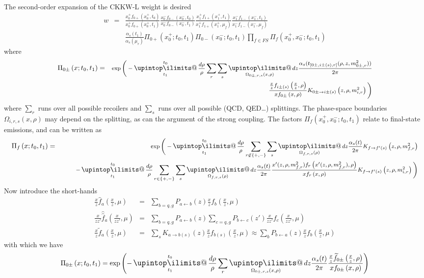 \documentclass[a4paper,11pt]{article}
\makeatletter
\newcommand{\mksmall}[1]{\textnormal{\smaller$#1$}}
\newcommand{\xfhathat}[3]{#2 \widehat{\widehat{f}}_{#1}\left(#2, #3\right)}
\newcommand{\xfhat}[3]{#2 \widehat{f}_{#1}\left(#2, #3\right)}
\newcommand{\xftilde}[3]{#2 \widetilde{f}_{#1}\left(#2, #3\right)}
\newcommand{\xf}[3]{#2 f_{#1}\left(#2, #3\right)}
\newcommand{\noem}[4]{\Pi_{#1}\left(#2; #3, #4\right)}
\newcommand{\psas}[2]{\frac{\alpha_s( t_{[#1]}(#2) )}{2\pi}}
\newcommand{\pskernel}[3]{K_{#1\rightarrow #2}\left(#3\right)}
\newcommand{\dglapkernel}[3]{P_{#1\leftarrow #2}\left(#3\right)}
\newcommand{\upint}{\DOTSI\upintop\ilimits@}
\renewcommand{\int}{\mathop{\mathlarger{\upint}}}
\makeatother
\begin{document}
The second-order expansion of the CKKW-L weight is desired
\begin{eqnarray}
w &=& 
\frac{ \xf{0+}{x_0^+}{t_0} }{ \xf{0+}{x_0^+}{t_1} }
\frac{\xf{0-}{x_0^-}{t_0}}{\xf{0-}{x_0^-}{t_1}}
\frac{\xf{1+}{x_1^+}{t_1}}{\xf{1+}{x_1^+}{\mu_f}}
\frac{\xf{1-}{x_1^-}{t_1}}{\xf{1-}{x_1^-}{\mu_f}}\\
&&
%
\frac{\alpha_s(t_1)}{\alpha_s(\mu_r)}
\noem{0+}{x_0^+}{t_0}{t_1}
\noem{0-}{x_0^-}{t_0}{t_1}
\prod_{f\in FS} \noem{f}{x_0^+,x_0^-}{t_0}{t_1}
\end{eqnarray}
where
\begin{eqnarray}
\noem{0\pm}{x}{t_0}{t_1} &=& \mksmall{\exp\Bigg(- \int\displaylimits_{t_1}^{t_0} \frac{d\rho}{\rho} \sum\limits_{r} \sum\limits_{s} \int\displaylimits_{\Omega_{0\pm,r,s}(x,\rho)} dz \psas{0\pm,i\pm(s),r}{\rho,z,m_{0\pm,r}^2}}
\\\nonumber
&&\qquad\qquad\qquad\qquad\qquad \mksmall{\frac{\xf{i\pm(s)}{\frac{x}{z}}{\rho}}{\xf{0\pm}{x}{\rho}} 
\pskernel{0\pm}{i\pm(s)}{z,\rho,m_{i,r}^2}
\Bigg)}
\end{eqnarray}
where $\sum_{r}$ runs over all possible recoilers and $\sum_{s}$ runs over all possible (QCD, QED\dots) splittings. The phase-space boundaries $\Omega_{i,r,s}(x,\rho)$ may depend on the splitting, as can the argument of the strong coupling. The factors $\noem{f}{x_0^+,x_0^-}{t_0}{t_1}$ relate to final-state emissions, and can be written as
\begin{eqnarray}
\noem{f}{x}{t_0}{t_1} &=& \mksmall{\exp\Bigg(- \int\displaylimits_{t_1}^{t_0} \frac{d\rho}{\rho} \sum\limits_{r\not\in \{+,-\}} \sum\limits_{s} \int\displaylimits_{\Omega_{f,r,s}(\rho)} dz \frac{\alpha_s(t)}{2\pi}
\pskernel{f}{f'(s)}{z,\rho,m_{f,r}^2}}\\\nonumber
&&\qquad 
\mksmall{- \int\displaylimits_{t_1}^{t_0} \frac{d\rho}{\rho} \sum\limits_{r\in \{+,-\}} \sum\limits_{s} \int\displaylimits_{\Omega_{f,r,s}(\rho)} dz \frac{\alpha_s(t)}{2\pi}
\frac{\xf{r}{x'(z,\rho,m_{f,r}^2)}{\rho}}{\xf{r}{x}{\rho}} 
\pskernel{f}{f'(s)}{z,\rho,m_{i,r}^2}
\Bigg)}
\end{eqnarray}
Now introduce the short-hands
\begin{eqnarray}
\xfhat{a}{\frac{x}{z}}{\mu} &=& \sum\limits_{b=q,g} \dglapkernel{a}{b}{z}  \xf{b}{\frac{x}{z}}{\mu}\\
\xfhathat{a}{\frac{x}{zz'}}{\mu} &=& \sum\limits_{b=q,g}  \dglapkernel{a}{b}{z}  \sum\limits_{c=q,g} \dglapkernel{b}{c}{z'}  \xf{c}{\frac{x}{zz'}}{\mu}\\
\xftilde{a}{\frac{x}{z}}{\mu} &=& \sum\limits_s \pskernel{a}{b(s)}{z}  \xf{b(s)}{\frac{x}{z}}{\mu} \approx \sum\limits_b \dglapkernel{b}{a}{z}  \xf{b}{\frac{x}{z}}{\mu}
\end{eqnarray}
with which we have
\begin{eqnarray}
\noem{0\pm}{x}{t_0}{t_1} = \exp\left(- \int\displaylimits_{t_1}^{t_0} \frac{d\rho}{\rho} \sum\limits_{r} \int\displaylimits_{\Omega_{0\pm,r,s}(x,\rho)} dz \frac{\alpha_s(t)}{2\pi} \frac{\xftilde{0\pm}{\frac{x}{z}}{\rho}}{\xf{0\pm}{x}{\rho}} 
\right)
\end{eqnarray}
\end{document}
